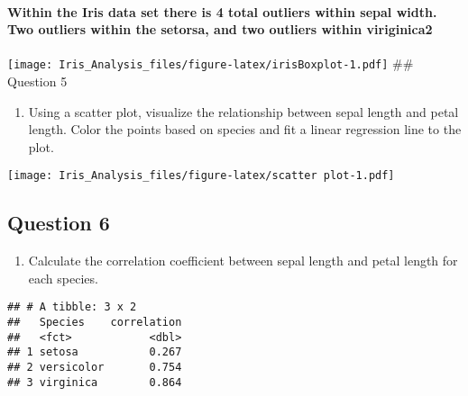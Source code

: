 \documentclass[
]{article}
\providecommand{\tightlist}{%
  \setlength{\itemsep}{0pt}\setlength{\parskip}{0pt}}
\begin{document}
\hypertarget{within-the-iris-data-set-there-is-4-total-outliers-within-sepal-width.-two-outliers-within-the-setorsa-and-two-outliers-within-viriginica2}{%
\paragraph{Within the Iris data set there is 4 total outliers within
sepal width. Two outliers within the setorsa, and two outliers within
viriginica2}\label{within-the-iris-data-set-there-is-4-total-outliers-within-sepal-width.-two-outliers-within-the-setorsa-and-two-outliers-within-viriginica2}}

\texttt{[image: Iris\_Analysis\_files/figure-latex/irisBoxplot-1.pdf]}
\#\# Question 5

\begin{enumerate}
\def\labelenumi{\arabic{enumi}.}
\setcounter{enumi}{4}
\tightlist
\item
  Using a scatter plot, visualize the relationship between sepal length
  and petal length. Color the points based on species and fit a linear
  regression line to the plot.
\end{enumerate}

\texttt{[image: Iris\_Analysis\_files/figure-latex/scatter plot-1.pdf]}

\hypertarget{question-6}{%
\subsection{Question 6}\label{question-6}}

\begin{enumerate}
\def\labelenumi{\arabic{enumi}.}
\setcounter{enumi}{5}
\tightlist
\item
  Calculate the correlation coefficient between sepal length and petal
  length for each species.
\end{enumerate}

\begin{verbatim}
## # A tibble: 3 x 2
##   Species    correlation
##   <fct>            <dbl>
## 1 setosa           0.267
## 2 versicolor       0.754
## 3 virginica        0.864
\end{verbatim}
\end{document}
